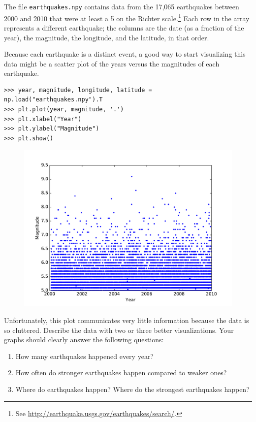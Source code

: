 \begin{problem} %
The file \texttt{earthquakes.npy} contains data from the 17,065 earthquakes between 2000 and 2010 that were at least a 5 on the Richter scale.\footnote{See \url{http://earthquake.usgs.gov/earthquakes/search/}.}
Each row in the array represents a different earthquake;
the columns are the date (as a fraction of the year), the magnitude, the longitude, and the latitude, in that order.

Because each earthquake is a distinct event, a good way to start visualizing this data might be a scatter plot of the years versus the magnitudes of each earthquake.

\begin{lstlisting}
>>> year, magnitude, longitude, latitude = np.load("earthquakes.npy").T
>>> plt.plot(year, magnitude, '.')
>>> plt.xlabel("Year")
>>> plt.ylabel("Magnitude")
>>> plt.show()
\end{lstlisting}

\begin{figure}[H] %
    \centering
    \includegraphics[width=.7\textwidth]{figures/earthquake.pdf}
\end{figure}

Unfortunately, this plot communicates very little information because the data is so cluttered.
Describe the data with two or three better visualizations.
Your graphs should clearly answer the following questions:
\begin{enumerate}
    \item How many earthquakes happened every year?
    \item How often do stronger earthquakes happen compared to weaker ones?
    \item Where do earthquakes happen? Where do the strongest earthquakes happen?
\end{enumerate}
\end{problem}

